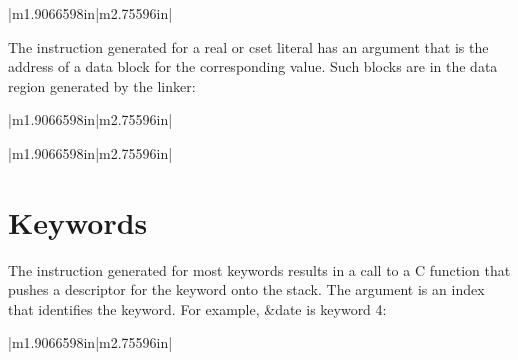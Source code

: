 \begin{flushleft}
\tablelasttail{\hline}
\begin{xtabular}{|m{1.9066598in}|m{2.75596in}|}

\end{xtabular}
\end{flushleft}

The instruction generated for a real or cset literal has an argument
that is the address of a data block for the corresponding value. Such
blocks are in the data region generated by the linker:

\begin{flushleft}
\tablelasttail{\hline}
\begin{xtabular}{|m{1.9066598in}|m{2.75596in}|}

\end{xtabular}
\end{flushleft}

\bigskip

\begin{flushleft}
\tablelasttail{\hline}
\begin{xtabular}{|m{1.9066598in}|m{2.75596in}|}

\end{xtabular}
\end{flushleft}
\section{Keywords}

The instruction generated for most keywords results in a call to a C
function that pushes a descriptor for the keyword onto the stack. The
argument is an index that identifies the keyword. For example, \&date
is keyword 4:

\begin{flushleft}
\tablelasttail{\hline}
\begin{xtabular}{|m{1.9066598in}|m{2.75596in}|}

\end{xtabular}
\end{flushleft}

